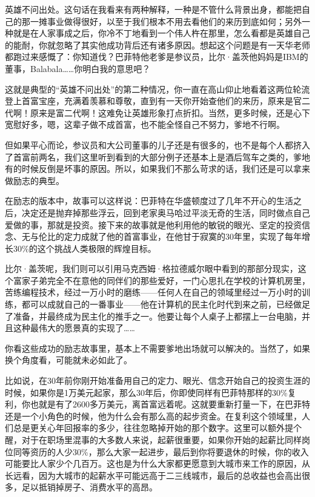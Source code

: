 英雄不问出处。这句话在我看来有两种解释，一种是不管什么背景出身，都能把自己的那一摊事业做得很好，以至于我们根本不用去看他们的来历到底如何；另外一种就是在人家事成之后，你冷不丁地看到一个伟人杵在那里，怎么看都是英雄自己的能耐，你就忽略了其实他成功背后还有诸多原因。想起这个问题是有一天华老师都跑过来感慨了：你知道伐？巴菲特他老爹是参议员，比尔·盖茨他妈妈是IBM的董事，Balabala\ldots\ldots 你明白我的意思吧？

这就是典型的``英雄不问出处''的第二种情况，你一直在高山仰止地看着这两位轮流登上首富宝座，充满着羡慕和尊敬，直到有一天你开始查他们的来历，原来是官二代啊！原来是富二代啊！这难免让英雄形象打点折扣。当然，更多时候，还是心下宽慰好多，嗯，这辈子做不成首富，也不能全怪自己不努力，爹地不行啊。

但如果平心而论，参议员和大公司董事的儿子还是有很多的，也不是每个人都挤入了首富前两名，我们这里听到看到的大部分例子还基本上是酒后驾车之类的，爹地有的时候反倒是坏事的原因。所以，如果我们不那么苛求的话，我们还是可以拿来做励志的典型。

在励志的版本中，故事可以这样说：巴菲特在华盛顿度过了几年不开心的生活之后，决定还是抛弃掉那些浮云，回到老家奥马哈过平淡无奇的生活，同时做点自己爱做的事，那就是投资。接下来的故事就是他利用他的敏锐的眼光、坚定的投资信念、无与伦比的定力成就了他的首富事业，在他甘于寂寞的30年里，实现了每年增长30\%的这个挑战人类极限的辉煌目标。

比尔·盖茨呢，我们则可以引用马克西姆·格拉德威尔眼中看到的那部分现实，这个富家子弟完全不在意他的同伴们的那些爱好，一门心思扎在学校的计算机房里，苦练编程技术，经过一万小时的磨练------任何人在自己的领域里经过一万小时的训练，都可以成就自己的一番事业------他在计算机的民主化时代到来之前，已经做足了准备，并最终成为民主化的推手之一。他要让每个人桌子上都摆上一台电脑，并且这种最伟大的愿景真的实现了\ldots\ldots{}

你看这些成功的励志故事里，基本上不需要爹地出场就可以解决的。当然了，如果换个角度看，可能就未必如此了。

比如说，在30年前你刚开始准备用自己的定力、眼光、信念开始自己的投资生涯的时候，如果你是1万美元起家，那么30年后，你即使同样有巴菲特那样的30\%复利，你也就是有了2600多万美元，离首富远着呢。这就要重新打量一下，在巴菲特还是一个小角色的时候，他为什么会有那么高的起步资金。在复利这个领域里，人们总是更关心年回报率的多少，往往忽略掉开始的那个数字。这里可以额外提个醒，对于在职场里混事的大多数人来说，起薪很重要，如果你开始的起薪比同样岗位同等资历的人少30\%，那么大家一起进步，最后到你将要退休的时候，你的收入可能要比人家少个几百万。这也是为什么大家都更愿意到大城市来工作的原因，从长远看，因为大城市的起薪水平可能远高于二三线城市，最后的总收益也会高出很多，足以抵销掉房子、消费水平的高昂。

